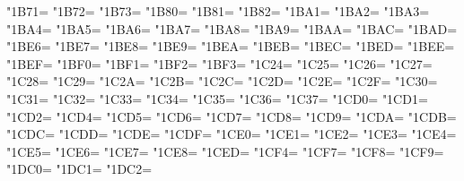 \XeTeXcharclass"1B71=\KclassCM
\XeTeXcharclass"1B72=\KclassCM
\XeTeXcharclass"1B73=\KclassCM
\XeTeXcharclass"1B80=\KclassCM
\XeTeXcharclass"1B81=\KclassCM
\XeTeXcharclass"1B82=\KclassCM
\XeTeXcharclass"1BA1=\KclassCM
\XeTeXcharclass"1BA2=\KclassCM
\XeTeXcharclass"1BA3=\KclassCM
\XeTeXcharclass"1BA4=\KclassCM
\XeTeXcharclass"1BA5=\KclassCM
\XeTeXcharclass"1BA6=\KclassCM
\XeTeXcharclass"1BA7=\KclassCM
\XeTeXcharclass"1BA8=\KclassCM
\XeTeXcharclass"1BA9=\KclassCM
\XeTeXcharclass"1BAA=\KclassCM
\XeTeXcharclass"1BAC=\KclassCM
\XeTeXcharclass"1BAD=\KclassCM
\XeTeXcharclass"1BE6=\KclassCM
\XeTeXcharclass"1BE7=\KclassCM
\XeTeXcharclass"1BE8=\KclassCM
\XeTeXcharclass"1BE9=\KclassCM
\XeTeXcharclass"1BEA=\KclassCM
\XeTeXcharclass"1BEB=\KclassCM
\XeTeXcharclass"1BEC=\KclassCM
\XeTeXcharclass"1BED=\KclassCM
\XeTeXcharclass"1BEE=\KclassCM
\XeTeXcharclass"1BEF=\KclassCM
\XeTeXcharclass"1BF0=\KclassCM
\XeTeXcharclass"1BF1=\KclassCM
\XeTeXcharclass"1BF2=\KclassCM
\XeTeXcharclass"1BF3=\KclassCM
\XeTeXcharclass"1C24=\KclassCM
\XeTeXcharclass"1C25=\KclassCM
\XeTeXcharclass"1C26=\KclassCM
\XeTeXcharclass"1C27=\KclassCM
\XeTeXcharclass"1C28=\KclassCM
\XeTeXcharclass"1C29=\KclassCM
\XeTeXcharclass"1C2A=\KclassCM
\XeTeXcharclass"1C2B=\KclassCM
\XeTeXcharclass"1C2C=\KclassCM
\XeTeXcharclass"1C2D=\KclassCM
\XeTeXcharclass"1C2E=\KclassCM
\XeTeXcharclass"1C2F=\KclassCM
\XeTeXcharclass"1C30=\KclassCM
\XeTeXcharclass"1C31=\KclassCM
\XeTeXcharclass"1C32=\KclassCM
\XeTeXcharclass"1C33=\KclassCM
\XeTeXcharclass"1C34=\KclassCM
\XeTeXcharclass"1C35=\KclassCM
\XeTeXcharclass"1C36=\KclassCM
\XeTeXcharclass"1C37=\KclassCM
\XeTeXcharclass"1CD0=\KclassCM
\XeTeXcharclass"1CD1=\KclassCM
\XeTeXcharclass"1CD2=\KclassCM
\XeTeXcharclass"1CD4=\KclassCM
\XeTeXcharclass"1CD5=\KclassCM
\XeTeXcharclass"1CD6=\KclassCM
\XeTeXcharclass"1CD7=\KclassCM
\XeTeXcharclass"1CD8=\KclassCM
\XeTeXcharclass"1CD9=\KclassCM
\XeTeXcharclass"1CDA=\KclassCM
\XeTeXcharclass"1CDB=\KclassCM
\XeTeXcharclass"1CDC=\KclassCM
\XeTeXcharclass"1CDD=\KclassCM
\XeTeXcharclass"1CDE=\KclassCM
\XeTeXcharclass"1CDF=\KclassCM
\XeTeXcharclass"1CE0=\KclassCM
\XeTeXcharclass"1CE1=\KclassCM
\XeTeXcharclass"1CE2=\KclassCM
\XeTeXcharclass"1CE3=\KclassCM
\XeTeXcharclass"1CE4=\KclassCM
\XeTeXcharclass"1CE5=\KclassCM
\XeTeXcharclass"1CE6=\KclassCM
\XeTeXcharclass"1CE7=\KclassCM
\XeTeXcharclass"1CE8=\KclassCM
\XeTeXcharclass"1CED=\KclassCM
\XeTeXcharclass"1CF4=\KclassCM
\XeTeXcharclass"1CF7=\KclassCM
\XeTeXcharclass"1CF8=\KclassCM
\XeTeXcharclass"1CF9=\KclassCM
\XeTeXcharclass"1DC0=\KclassCM
\XeTeXcharclass"1DC1=\KclassCM
\XeTeXcharclass"1DC2=\KclassCM
